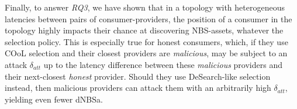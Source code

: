 Finally, to answer \emph{RQ3}, we have shown that in a topology with heterogeneous latencies between pairs of consumer-providers, the position of a consumer in the topology highly impacts their chance at discovering NBS-assets, whatever the selection policy.
This is especially true for honest consumers, which, if they use COoL selection and their closest providers are \emph{malicious}, may be subject to an attack $\delta_{att}$ up to the latency difference between these \emph{malicious} providers and their next-closest \emph{honest} provider.
Should they use DeSearch-like selection instead, then malicious providers can attack them with an arbitrarily high $\delta_{att}$, yielding even fewer dNBSa.

